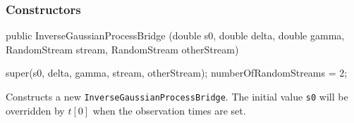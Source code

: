 \subsubsection* {Constructors}
\begin{code}

   public InverseGaussianProcessBridge (double s0, double delta, 
                                        double gamma, RandomStream stream,
                                        RandomStream otherStream) \begin{hide} {
        super(s0, delta, gamma, stream, otherStream);
        numberOfRandomStreams = 2;
    }\end{hide}
\end{code}
\begin{tabb} Constructs a new \texttt{InverseGaussianProcessBridge}.
The initial value \texttt{s0} will be overridden by $t[0]$ when
the observation times are set.
\end{tabb}



